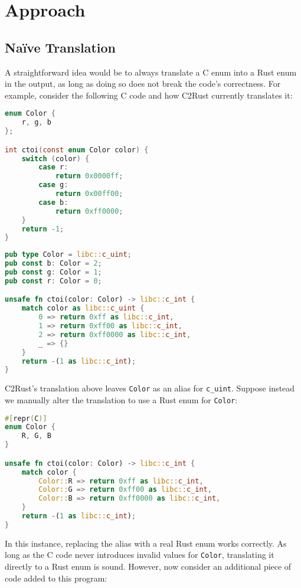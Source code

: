 \documentclass[peerreview, 10pt]{IEEEtran}
\begin{document}
\section{Approach}

\subsection{Na\"ive Translation}

A straightforward idea would be to always translate a C enum into a Rust enum in the output, as long as doing so does not break the code's correctness. For example, consider the following C code and how C2Rust currently translates it:

\begin{lstlisting}[language=C]
enum Color {
    r, g, b
};

int ctoi(const enum Color color) {
    switch (color) {
        case r:
            return 0x0000ff;
        case g:
            return 0x00ff00;
        case b:
            return 0xff0000;
    }
    return -1;
}
\end{lstlisting}

\begin{lstlisting}[language=Rust]
pub type Color = libc::c_uint;
pub const b: Color = 2;
pub const g: Color = 1;
pub const r: Color = 0;

unsafe fn ctoi(color: Color) -> libc::c_int {
    match color as libc::c_uint {
        0 => return 0xff as libc::c_int,
        1 => return 0xff00 as libc::c_int,
        2 => return 0xff0000 as libc::c_int,
        _ => {}
    }
    return -(1 as libc::c_int);
}
\end{lstlisting}

C2Rust's translation above leaves \texttt{Color} as an alias for \texttt{c\_uint}. Suppose instead we manually alter the translation to use a Rust enum for \texttt{Color}:

\begin{lstlisting}[language=Rust]
#[repr(C)]
enum Color {
    R, G, B
}

unsafe fn ctoi(color: Color) -> libc::c_int {
    match color {
        Color::R => return 0xff as libc::c_int,
        Color::G => return 0xff00 as libc::c_int,
        Color::B => return 0xff0000 as libc::c_int,
    }
    return -(1 as libc::c_int);
}
\end{lstlisting}

In this instance, replacing the alias with a real Rust enum works correctly. As long as the C code never introduces invalid values for \texttt{Color}, translating it directly to a Rust enum is sound. However, now consider an additional piece of code added to this program:
\end{document}
